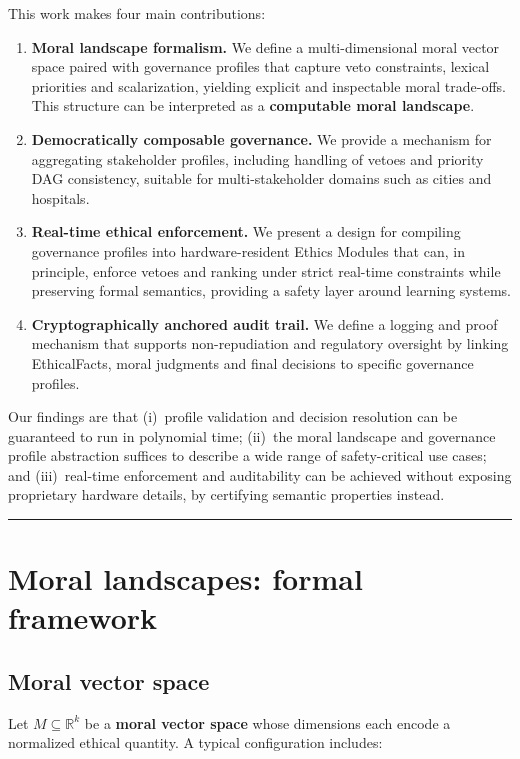 \documentclass[11pt]{article}
\begin{document}
This work makes four main contributions:

\begin{enumerate}
  \item \textbf{Moral landscape formalism.} We define a multi-dimensional moral vector space paired with governance profiles that capture veto constraints, lexical priorities and scalarization, yielding explicit and inspectable moral trade-offs. This structure can be interpreted as a \textbf{computable moral landscape}.
  \item \textbf{Democratically composable governance.} We provide a mechanism for aggregating stakeholder profiles, including handling of vetoes and priority DAG consistency, suitable for multi-stakeholder domains such as cities and hospitals.
  \item \textbf{Real-time ethical enforcement.} We present a design for compiling governance profiles into hardware-resident Ethics Modules that can, in principle, enforce vetoes and ranking under strict real-time constraints while preserving formal semantics, providing a safety layer around learning systems.
  \item \textbf{Cryptographically anchored audit trail.} We define a logging and proof mechanism that supports non-repudiation and regulatory oversight by linking EthicalFacts, moral judgments and final decisions to specific governance profiles.
\end{enumerate}

Our findings are that (i)~profile validation and decision resolution can be guaranteed to run in polynomial time; (ii)~the moral landscape and governance profile abstraction suffices to describe a wide range of safety-critical use cases; and (iii)~real-time enforcement and auditability can be achieved without exposing proprietary hardware details, by certifying semantic properties instead.

\hrule
\vspace{1em}

\section{Moral landscapes: formal framework}

\subsection{Moral vector space}

Let $M \subseteq \mathbb{R}^k$ be a \textbf{moral vector space} whose dimensions each encode a normalized ethical quantity. A typical configuration includes:
\end{document}
